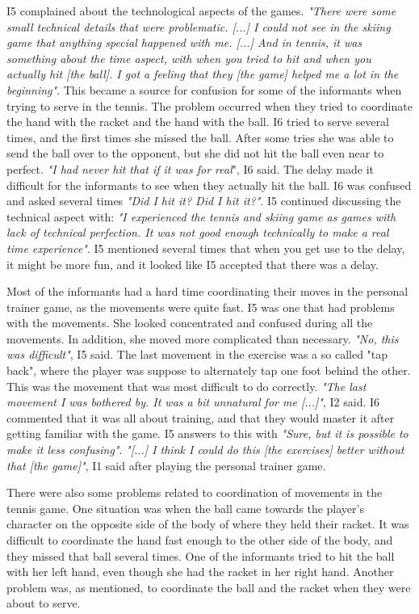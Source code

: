 I5 complained about the technological aspects of the games. \emph{"There were some small technical details that were problematic. [...] I could not see in the skiing game that anything special happened with me. [...] And in tennis, it was something about the time aspect, with when you tried to hit and when you actually hit [the ball]. I got a feeling that they [the game] helped me a lot in the beginning"}. This became a source for confusion for some of the informants when trying to serve in the tennis. The problem occurred when they tried to coordinate the hand with the racket and the hand with the ball. I6 tried to serve several times, and the first times she missed the ball. After some tries she was able to send the ball over to the opponent, but she did not hit the ball even near to perfect. \emph{"I had never hit that if it was for real}", I6 said. The delay made it difficult for the informants to see when they actually hit the ball. I6 was confused and asked several times \emph{"Did I hit it? Did I hit it?"}. I5 continued discussing the technical aspect with: \emph{"I experienced the tennis and skiing game as games with lack of technical perfection. It was not good enough technically to make a real time experience"}. I5 mentioned several times that when you get use to the delay, it might be more fun, and it looked like I5 accepted that there was a delay. 

Most of the informants had a hard time coordinating their moves in the personal trainer game, as the movements were quite fast. I5 was one that had problems with the movements. She looked concentrated and confused during all the movements. In addition, she moved more complicated than necessary. \emph{"No, this was difficult"}, I5 said. The last movement in the exercise was a so called "tap back", where the player was suppose to alternately tap one foot behind the other. This was the movement that was most difficult to do correctly. \emph{"The last movement I was bothered by. It was a bit unnatural for me [...]"}, I2 said. I6 commented that it was all about training, and that they would master it after getting familiar with the game. I5 answers to this with \emph{"Sure, but it is possible to make it less confusing"}. \emph{"[...] I think I could do this [the exercises] better without that [the game]"}, I1 said after playing the personal trainer game. 

There were also some problems related to coordination of movements in the tennis game. One situation was when the ball came towards the player's character on the opposite side of the body of where they held their racket. It was difficult to coordinate the hand fast enough to the other side of the body, and they missed that ball several times. One of the informants tried to hit the ball with her left hand, even though she had the racket in her right hand. Another problem was, as mentioned, to coordinate the ball and the racket when they were about to serve. 

